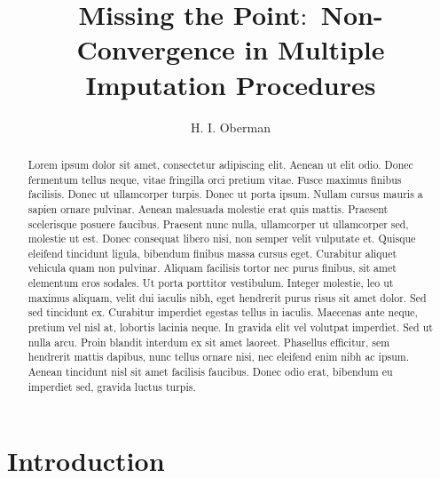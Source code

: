\documentclass[Royal,times,sageh]{sagej}
\begin{document}
\title{Missing the Point\(\colon\) Non-Convergence in Multiple Imputation
Procedures}


\author{H. I. Oberman}




\begin{abstract}
Lorem ipsum dolor sit amet, consectetur adipiscing elit. Aenean ut elit
odio. Donec fermentum tellus neque, vitae fringilla orci pretium vitae.
Fusce maximus finibus facilisis. Donec ut ullamcorper turpis. Donec ut
porta ipsum. Nullam cursus mauris a sapien ornare pulvinar. Aenean
malesuada molestie erat quis mattis. Praesent scelerisque posuere
faucibus. Praesent nunc nulla, ullamcorper ut ullamcorper sed, molestie
ut est. Donec consequat libero nisi, non semper velit vulputate et.
Quisque eleifend tincidunt ligula, bibendum finibus massa cursus eget.
Curabitur aliquet vehicula quam non pulvinar. Aliquam facilisis tortor
nec purus finibus, sit amet elementum eros sodales. Ut porta porttitor
vestibulum. Integer molestie, leo ut maximus aliquam, velit dui iaculis
nibh, eget hendrerit purus risus sit amet dolor. Sed sed tincidunt ex.
Curabitur imperdiet egestas tellus in iaculis. Maecenas ante neque,
pretium vel nisl at, lobortis lacinia neque. In gravida elit vel
volutpat imperdiet. Sed ut nulla arcu. Proin blandit interdum ex sit
amet laoreet. Phasellus efficitur, sem hendrerit mattis dapibus, nunc
tellus ornare nisi, nec eleifend enim nibh ac ipsum. Aenean tincidunt
nisl sit amet facilisis faucibus. Donec odio erat, bibendum eu imperdiet
sed, gravida luctus turpis.
\end{abstract}


\maketitle

\hypertarget{introduction}{%
\section{Introduction}\label{introduction}}
\end{document}
